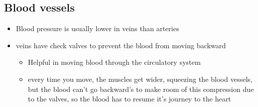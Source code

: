 \documentclass{article}
\theoremstyle{definition}
\begin{document}
\subsection{Blood vessels}
\begin{itemize}
	\item Blood pressure is usually lower in veins than arteries
	\item veins have check valves to prevent the blood from moving backward
		\begin{itemize}
			\item Helpful in moving blood through the circulatory system
			\item every time you move, the muscles get wider, squeezing the blood vessels, but the blood can't go backward's to make room of this compression due to the valves, so the blood has to resume it's journey to the heart
		\end{itemize}


\end{itemize}
\end{document}
